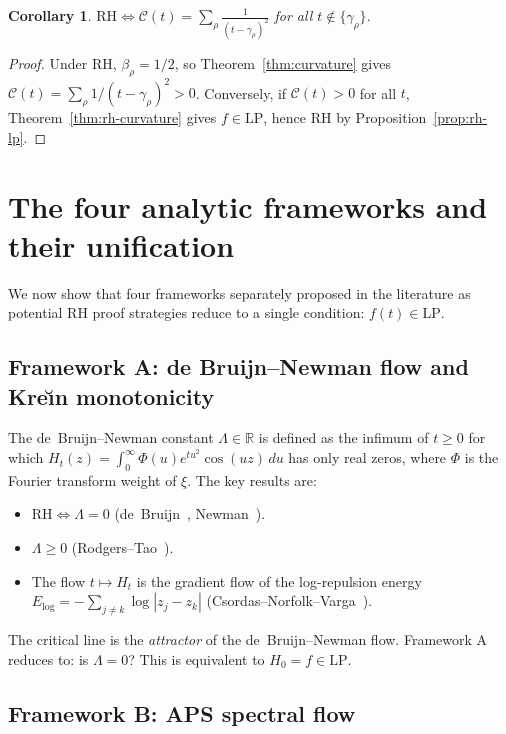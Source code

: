 \documentclass[11pt]{amsart}
\newtheorem{corollary}[theorem]{Corollary}
\newcommand{\LP}{\mathrm{LP}}
\begin{document}
\begin{corollary}
$\mathrm{RH} \iff \mathcal{C}(t) = \displaystyle\sum_\rho \frac{1}{(t-\gamma_\rho)^2}$
for all $t \notin \{\gamma_\rho\}$.
\end{corollary}

\begin{proof}
Under RH, $\beta_\rho = 1/2$, so Theorem~\ref{thm:curvature} gives
$\mathcal{C}(t) = \sum_\rho 1/(t-\gamma_\rho)^2 > 0$. Conversely, if
$\mathcal{C}(t) > 0$ for all $t$, Theorem~\ref{thm:rh-curvature} gives $f \in \LP$,
hence RH by Proposition~\ref{prop:rh-lp}.
\end{proof}

\section{The four analytic frameworks and their unification}
\label{sec:fronts}

We now show that four frameworks separately proposed in the literature as potential
RH proof strategies reduce to a single condition: $f(t) \in \LP$.

\subsection{Framework A: de Bruijn--Newman flow and Kre\u{\i}n monotonicity}

The de~Bruijn--Newman constant $\Lambda \in \mathbb{R}$ is defined as the infimum of
$t \geq 0$ for which $H_t(z) = \int_0^\infty \Phi(u)e^{tu^2}\cos(uz)\,du$ has only
real zeros, where $\Phi$ is the Fourier transform weight of $\xi$.
The key results are:
\begin{itemize}
  \item $\mathrm{RH} \iff \Lambda = 0$ (de~Bruijn~\cite{deBruijn1950}, Newman~\cite{Newman1976}).
  \item $\Lambda \geq 0$ (Rodgers--Tao~\cite{RodgersTao2020}).
  \item The flow $t \mapsto H_t$ is the gradient flow of the log-repulsion energy
    $E_{\log} = -\sum_{j\neq k}\log|z_j-z_k|$ (Csordas--Norfolk--Varga~\cite{CNV1988}).
\end{itemize}
The critical line is the \emph{attractor} of the de~Bruijn--Newman flow.
Framework A reduces to: is $\Lambda = 0$?  This is equivalent to $H_0 = f \in \LP$.

\subsection{Framework B: APS spectral flow}
\end{document}
